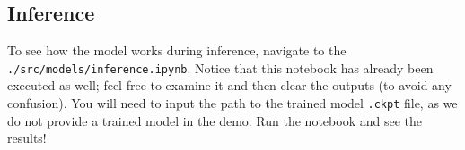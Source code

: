 \subsection{Inference}\label{inference}

To see how the model works during inference, navigate
to the \\
\texttt{./src/models/inference.ipynb}. Notice
that this notebook has already been executed as well; feel free to examine it and then
clear the outputs (to avoid any confusion). You will need to
input the path to the trained model \texttt{.ckpt} file, as we do
not provide a trained model in the demo. Run the notebook and
see the results!